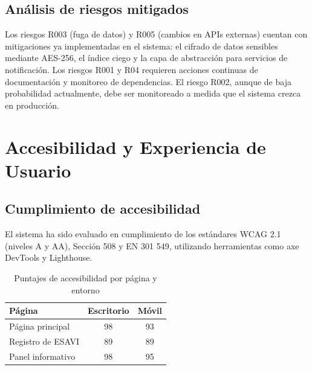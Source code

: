 \documentclass[12pt,letterpaper]{article}
\begin{document}
\subsection{Análisis de riesgos mitigados}

Los riesgos R003 (fuga de datos) y R005 (cambios en APIs externas) cuentan con mitigaciones ya implementadas en el sistema: el cifrado de datos sensibles mediante AES-256, el índice ciego y la capa de abstracción para servicios de notificación. Los riesgos R001 y R04 requieren acciones continuas de documentación y monitoreo de dependencias. El riesgo R002, aunque de baja probabilidad actualmente, debe ser monitoreado a medida que el sistema crezca en producción.











	\section{Accesibilidad y Experiencia de Usuario}

\subsection{Cumplimiento de accesibilidad}

El sistema ha sido evaluado en cumplimiento de los estándares WCAG 2.1 (niveles A y AA), Sección 508 y EN 301 549, utilizando herramientas como axe DevTools y Lighthouse.

\begin{table}[H]
\centering
\caption{Puntajes de accesibilidad por página y entorno}
\label{tab:accesibilidad-resultados}
\begin{tabular}{|l|c|c|}
\hline
\textbf{Página} & \textbf{Escritorio} & \textbf{Móvil} \\ \hline
Página principal & 98 & 93 \\ \hline
Registro de ESAVI & 89 & 89 \\ \hline
Panel informativo & 98 & 95 \\ \hline
\end{tabular}
\end{table}
\end{document}
